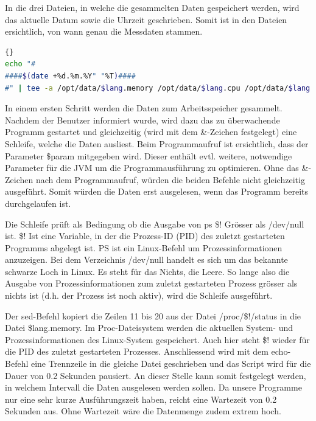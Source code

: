 \documentclass{fancydocument}
\begin{document}
In die drei Dateien, in welche die gesammelten Daten gespeichert werden, wird das aktuelle Datum sowie die Uhrzeit geschrieben. Somit ist in den Dateien ersichtlich, von wann genau die Messdaten stammen.

\begin{minipage}{\textwidth}
\begin{lstlisting}[language=bash,caption=Titel einfügen]{}
echo "#
####$(date +%d.%m.%Y" "%T)####
#" | tee -a /opt/data/$lang.memory /opt/data/$lang.cpu /opt/data/$lang.time > /dev/null
\end{lstlisting}
\end{minipage}

In einem ersten Schritt werden die Daten zum Arbeitsspeicher gesammelt. Nachdem der Benutzer informiert wurde, wird dazu das zu überwachende Programm gestartet und gleichzeitig (wird mit dem \&-Zeichen festgelegt) eine Schleife, welche die Daten ausliest. Beim Programmaufruf ist ersichtlich, dass der Parameter \$param mitgegeben wird. Dieser enthält evtl. weitere, notwendige Parameter für die JVM um die Programmausführung zu optimieren. Ohne das \&-Zeichen nach dem Programmaufruf, würden die beiden Befehle nicht gleichzeitig ausgeführt. Somit würden die Daten erst ausgelesen, wenn das Programm bereits durchgelaufen ist. 

Die Schleife prüft als Bedingung ob die Ausgabe von ps \$! Grösser als /dev/null ist. \$! Ist eine Variable, in der die Prozess-ID (PID) des zuletzt gestarteten Programms abgelegt ist. PS ist ein Linux-Befehl um Prozessinformationen anzuzeigen. Bei dem Verzeichnis /dev/null handelt es sich um das bekannte schwarze Loch in Linux. Es steht für das Nichts, die Leere. So lange also die Ausgabe von Prozessinformationen zum zuletzt gestarteten Prozess grösser als nichts ist (d.h. der Prozess ist noch aktiv), wird die Schleife ausgeführt.

Der sed-Befehl kopiert die Zeilen 11 bis 20 aus der Datei /proc/\$!/status in die Datei \$lang.memory. Im Proc-Dateisystem werden die aktuellen System- und Prozessinformationen des Linux-System gespeichert. Auch hier steht \$! wieder für die PID des zuletzt gestarteten Prozesses. Anschliessend wird mit dem echo-Befehl eine Trennzeile in die gleiche Datei geschrieben und das Script wird für die Dauer von 0.2 Sekunden pausiert. An dieser Stelle kann somit festgelegt werden, in welchem Intervall die Daten ausgelesen werden sollen. Da unsere Programme nur eine sehr kurze Ausführungszeit haben, reicht eine Wartezeit von 0.2 Sekunden aus. Ohne Wartezeit wäre die Datenmenge zudem extrem hoch.
\end{document}
